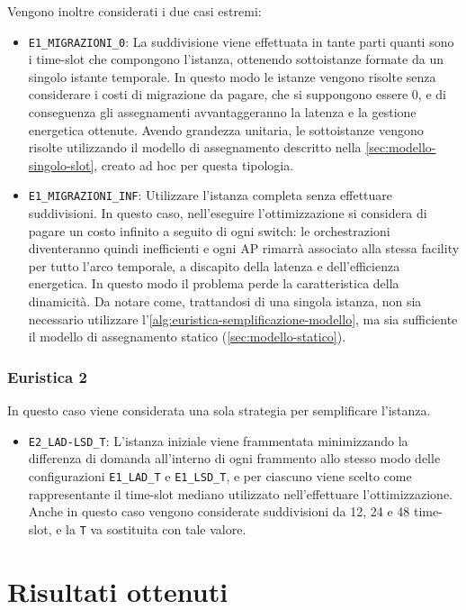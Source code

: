 Vengono inoltre considerati i due casi estremi:
\begin{itemize}
    \item \texttt{E1\_MIGRAZIONI\_0}: La suddivisione viene effettuata in tante parti quanti sono i time-slot che compongono l'istanza, ottenendo sottoistanze formate da un singolo istante temporale. In questo modo le istanze vengono risolte senza considerare i costi di migrazione da pagare, che si suppongono essere 0, e di conseguenza gli assegnamenti avvantaggeranno la latenza e la gestione energetica ottenute. Avendo grandezza unitaria, le sottoistanze vengono risolte utilizzando il modello di assegnamento descritto nella \autoref{sec:modello-singolo-slot}, creato ad hoc per questa tipologia.

    \item \texttt{E1\_MIGRAZIONI\_INF}: Utilizzare l'istanza completa senza effettuare suddivisioni. In questo caso, nell'eseguire l'ottimizzazione si considera di pagare un costo infinito a seguito di ogni switch: le orchestrazioni diventeranno quindi inefficienti e ogni AP rimarrà associato alla stessa facility per tutto l'arco temporale, a discapito della latenza e dell'efficienza energetica. In questo modo il problema perde la caratteristica della dinamicità. Da notare come, trattandosi di una singola istanza, non sia necessario utilizzare l'\autoref{alg:euristica-semplificazione-modello}, ma sia sufficiente il modello di assegnamento statico (\autoref{sec:modello-statico}).
\end{itemize}

\subsubsection{Euristica 2}

In questo caso viene considerata una sola strategia per semplificare l'istanza.
\begin{itemize}
    \item \texttt{E2\_LAD-LSD\_T}: L'istanza iniziale viene frammentata minimizzando la differenza di domanda all'interno di ogni frammento allo stesso modo delle configurazioni \texttt{E1\_LAD\_T} e \texttt{E1\_LSD\_T}, e per ciascuno viene scelto come rappresentante il time-slot mediano utilizzato nell'effettuare l'ottimizzazione. Anche in questo caso vengono considerate suddivisioni da 12, 24 e 48 time-slot, e la \texttt{T} va sostituita con tale valore.
\end{itemize}


%
%
\section{Risultati ottenuti}
\label{sec:risultati}

